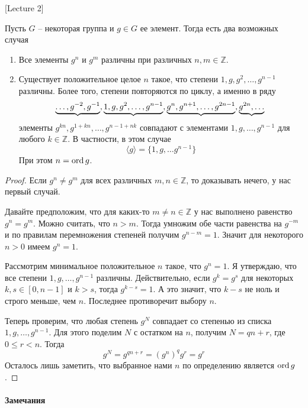 [Lecture 2]


\begin{claim}
\label{claim::CyclicClass}
Пусть $G$ -- некоторая группа и $g\in G$ ее элемент.
Тогда есть два возможных случая
\begin{enumerate}
\item Все элементы $g^n$ и $g^m$ различны при различных $n,m\in \mathbb Z$.

\item Существует положительное целое $n$ такое, что степени $1, g, g^2, \ldots, g^{n-1}$ различны.
Более того, степени повторяются по циклу, а именно в ряду
\[
\underbrace{\ldots, g^{-2},g^{-1}},\underbrace{1, g, g^2, \ldots, g^{n-1}}, \underbrace{g^n, g^{n+1},\ldots,g^{2n - 1}}, \underbrace{g^{2n},\ldots}\\
\]
элементы $g^{kn}, g^{1 + kn}, \ldots, g^{n-1 + nk}$ совпадают с элементами $1, g, \ldots, g^{n-1}$ для любого $k\in \mathbb Z$.
В частности, в этом случае
\[
\langle g\rangle =\{1,g,\ldots g^{n-1}\}
\]
При этом $n = \operatorname{ord} g$.
\end{enumerate}
\end{claim}
\begin{proof}
Если $g^n \neq g^m$ для всех различных $m, n\in \mathbb Z$, то доказывать нечего, у нас первый случай.

Давайте предположим, что для каких-то $m\neq n\in \mathbb Z$ у нас выполнено равенство $g^n = g^m$.
Можно считать, что $n > m$.
Тогда умножим обе части равенства на $g^{-m}$ и по правилам перемножения степеней получим $g^{n-m} = 1$.
Значит для некоторого $n > 0$ имеем $g^n = 1$.

Рассмотрим минимальное положительное $n$ такое, что $g^n = 1$.
Я утверждаю, что все степени $1, g, \ldots, g^{n-1}$ различны.
Действительно, если $g^k = g^s$ для некоторых $k,s \in [0, n-1]$ и $k > s$, тогда $g^{k-s} = 1$.
А это значит, что $k - s$ не ноль и строго меньше, чем $n$.
Последнее противоречит выбору $n$.

Теперь проверим, что любая степень $g^N$ совпадает со степенью из списка  $1, g, \ldots, g^{n-1}$.
Для этого поделим $N$ с остатком на $n$, получим $N = qn + r$, где $0 \leqslant r < n$.
Тогда
\[
g^N = g^{qn + r} = (g^n)^q g^r = g^r
\]
Осталось лишь заметить, что выбранное нами $n$ по определению является $\operatorname{ord} g$.
\end{proof}

\paragraph{Замечания}

